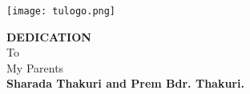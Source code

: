 \begin{center}
	\texttt{[image: tulogo.png]}
\end{center}
\begin {center}
\vspace{1.5cm}

{\Large{\bfseries {DEDICATION}}}\\[2cm]

To\\[0.5cm]
My Parents\\
{\bfseries {\color{blue} Sharada Thakuri and Prem Bdr. Thakuri.}}\\[8mm]
\end {center}
